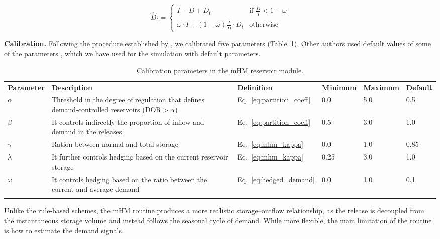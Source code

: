 \documentclass[hess, manuscript]{copernicus}
\begin{document}
\begin{equation}
\label{eq:hedged_demand}
    \hat{D}_t =
    \begin{cases}
        \overline{I} - \overline{D} + D_t  & \text{if } \frac{\overline{D}}{\overline{I}} < 1 - \omega \\
        \omega \cdot \overline{I} + (1 - \omega) \frac{\overline{I}}{\overline{D}} \cdot D_t & \text{otherwise}        
    \end{cases}
\end{equation}

\medskip
\textbf{Calibration.} Following the procedure established by \citet{Shrestha2024}, we calibrated five parameters (Table~\ref{tab:parameters_mhm}). Other authors used default values of some of the parameters \citep{Hanasaki2006, Shin2019, Sadki2023}, which we have used for the simulation with default parameters.

\begin{table}[t]
    \centering
    \caption{Calibration parameters in the mHM reservoir module.}
    \begin{tabularx}{\textwidth}{lXllll}
        \tophline
        \textbf{Parameter} & \textbf{Description} & \textbf{Definition} & \textbf{Minimum} & \textbf{Maximum} & \textbf{Default} \\
        \middlehline
        $\alpha$ & Threshold in the degree of regulation that defines demand-controlled reservoirs ($\text{DOR} > \alpha$) & Eq.~\ref{eq:partition_coeff} & 0.0 & 5.0 & 0.5 \\
        $\beta$ & It controls indirectly the proportion of inflow and demand in the releases & Eq.~\ref{eq:partition_coeff} & 0.5 & 3.0 & 1.0 \\
        $\gamma$ & Ration between normal and total storage & Eq.~\ref{eq:mhm_kappa} & 0.0 & 1.0 & 0.85 \\
        $\lambda$ & It further controls hedging based on the current reservoir storage & Eq.~\ref{eq:mhm_kappa} & 0.25 & 3.0 & 1.0 \\
        $\omega$ & It controls hedging based on the ratio between the current and average demand & Eq.~\ref{eq:hedged_demand} & 0.0 & 1.0 & 0.1 \\
        \bottomhline
    \end{tabularx}
    \label{tab:parameters_mhm}
\end{table}

Unlike the rule-based schemes, the mHM routine produces a more realistic storage–outflow relationship, as the release is decoupled from the instantaneous storage volume and instead follows the seasonal cycle of demand. While more flexible, the main limitation of the routine is how to estimate the demand signals.
\end{document}
